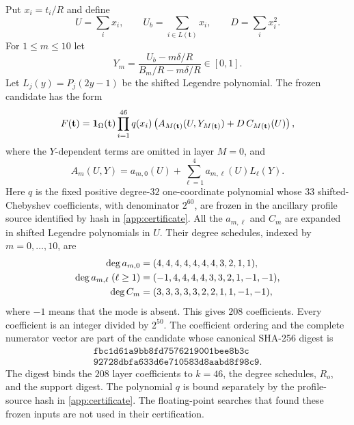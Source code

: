 Put $x_i=t_i/R$ and define
\[
 U=\sum_i x_i,\qquad
 U_b=\sum_{i\in L(\mathbf t)}x_i,\qquad
 D=\sum_i x_i^2.
\]
For $1\le m\le10$ let
\begin{equation}\label{eq:Y-m}
 Y_m=\frac{U_b-m\delta/R}{B_m/R-m\delta/R}\in[0,1].
\end{equation}
Let $L_j(y)=P_j(2y-1)$ be the shifted Legendre polynomial.  The frozen
candidate has the form
\begin{equation}\label{eq:test-function}
 F(\mathbf t)=\mathbf 1_{\Omega}(\mathbf t)
 \prod_{i=1}^{46}q(x_i)
 \left(A_{M(\mathbf t)}(U,Y_{M(\mathbf t)})
       +D\,C_{M(\mathbf t)}(U)\right),
\end{equation}
where the $Y$-dependent terms are omitted in layer $M=0$, and
\begin{equation}\label{eq:A-layer}
 A_m(U,Y)=a_{m,0}(U)+\sum_{\ell=1}^{4}a_{m,\ell}(U)L_\ell(Y).
\end{equation}
Here $q$ is the fixed positive degree-$32$ one-coordinate polynomial whose
$33$ shifted-Chebyshev coefficients, with denominator $2^{60}$, are frozen in
the ancillary profile source identified by hash in
\cref{app:certificate}.  All the $a_{m,\ell}$ and $C_m$ are expanded
in shifted Legendre polynomials in $U$.  Their degree schedules, indexed by
$m=0,\ldots,10$, are
\begin{align}
 \deg a_{m,0}&=(4,4,4,4,4,4,4,3,2,1,1),\notag\\
 \deg a_{m,\ell}\;(\ell\ge1)
 &=(-1,4,4,4,4,3,3,2,1,-1,-1),\notag\\
 \deg C_m&=(3,3,3,3,3,2,2,1,1,-1,-1),
\label{eq:degree-schedules}
\end{align}
where $-1$ means that the mode is absent.  This gives $208$ coefficients.
Every coefficient is an integer divided by $2^{50}$.  The coefficient
ordering and the complete numerator vector are part of the candidate whose
canonical SHA-256 digest is
\begin{equation}\label{eq:candidate-hash}
\begin{gathered}
\mathtt{fbc1d61a9bb8fd7576219001bee8b3c}\\
\mathtt{92728dbfa633d6e710583d8aabd8f98c9}.
\end{gathered}
\end{equation}
The digest binds the $208$ layer coefficients to $k=46$, the degree schedules,
$R_o$, and the support digest.  The polynomial $q$ is bound separately by the
profile-source hash in \cref{app:certificate}.  The floating-point searches
that found these frozen inputs are not used in their certification.

